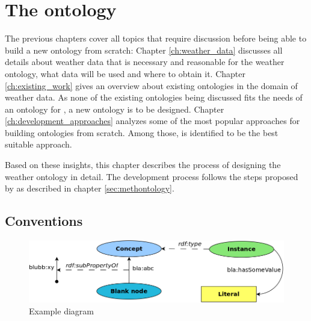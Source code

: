 \chapter{The \thinkhomeweather ontology}
\label{ch:thinkhomeweather_ontology}






The previous chapters cover all topics that require discussion before being able to build a new ontology from scratch: Chapter \ref{ch:weather_data} discusses all details about weather data that is necessary and reasonable for the \thinkhome weather ontology, what data will be used and where to obtain it. Chapter \ref{ch:existing_work} gives an overview about existing ontologies in the domain of weather data. As none of the existing ontologies being discussed fits the needs of an ontology for \thinkhome, a new ontology is to be designed. Chapter \ref{ch:development_approaches} analyzes some of the most popular approaches for building ontologies from scratch. Among those, \methontology \cite{Methontology} is identified to be the best suitable approach.

Based on these insights, this chapter describes the process of designing the \thinkhome weather ontology in detail. The development process follows the steps proposed by \methontology as described in chapter \ref{sec:methontology}.

\section{Conventions}
\label{sec:ontology_conventions}

\begin{figure}
  \includegraphics[width=\textwidth]{figures/diagrams/template.png}
  \caption{Example diagram}
  \label{fig:diagram_example}
\end{figure}

